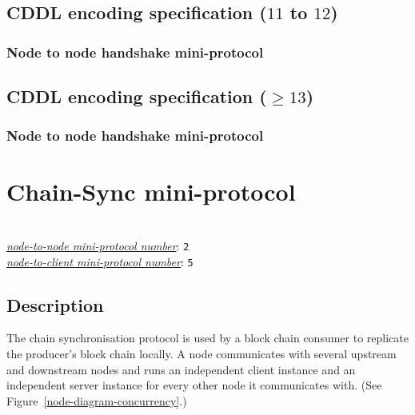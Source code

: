 \subsection{CDDL encoding specification ($11$ to $12$)}\label{handshake-cddl}

\subsubsection{Node to node handshake mini-protocol}


\subsection{CDDL encoding specification ($\geq 13$)}\label{handshake-cddl}

\subsubsection{Node to node handshake mini-protocol}


\section{Chain-Sync mini-protocol}
\label{chain-sync-protocol}
\\
\hyperref[table:node-to-node-protocol-numbers]{\textit{node-to-node mini-protocol number}}: \texttt{2}\\
\hyperref[table:node-to-client-protocol-numbers]{\textit{node-to-client mini-protocol number}}: \texttt{5}\\ 

\newcommand{\StCanAwait}{\state{StCanAwait}}
\newcommand{\StMustReply}{\state{StMustReply}}
\newcommand{\StIntersect}{\state{StIntersect}}
\newcommand{\MsgRequestNext}{\msg{MsgRequestNext}}
\newcommand{\MsgAwaitReply}{\msg{MsgAwaitReply}}
\newcommand{\MsgRollForward}{\msg{MsgRollForward}}
\newcommand{\MsgRollBackward}{\msg{MsgRollBackward}}
\newcommand{\MsgFindIntersect}{\msg{MsgFindIntersect}}
\newcommand{\MsgIntersectFound}{\msg{MsgIntersectFound}}
\newcommand{\MsgIntersectNotFound}{\msg{MsgIntersectNotFound}}

\subsection{Description}
The chain synchronisation protocol is used by a block chain consumer
to replicate the producer's block chain locally.
A node communicates with several upstream and downstream nodes
and runs an independent client instance and an independent server instance for every
other node it communicates with.
(See Figure~\ref{node-diagram-concurrency}.)

